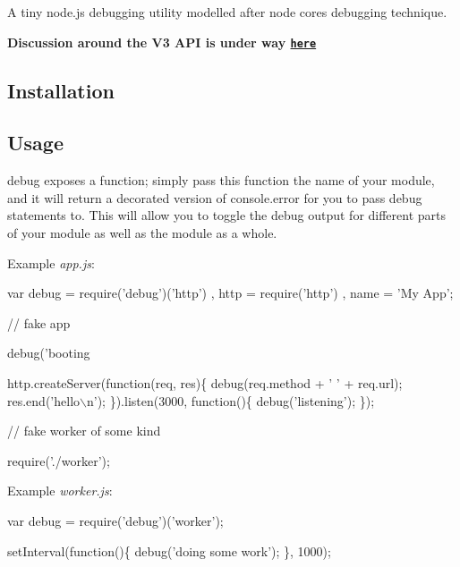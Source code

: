 \href{https://travis-ci.org/visionmedia/debug}{\tt } \href{https://coveralls.io/github/visionmedia/debug?branch=master}{\tt } \href{https://visionmedia-community-slackin.now.sh/}{\tt } \href{#backers}{\tt } \href{#sponsors}{\tt }

A tiny node.\+js debugging utility modelled after node core\textquotesingle{}s debugging technique.

{\bfseries Discussion around the V3 A\+PI is under way \href{https://github.com/visionmedia/debug/issues/370}{\tt here}}

\subsection*{Installation}




\subsection*{Usage}

{\ttfamily debug} exposes a function; simply pass this function the name of your module, and it will return a decorated version of {\ttfamily console.\+error} for you to pass debug statements to. This will allow you to toggle the debug output for different parts of your module as well as the module as a whole.

Example {\itshape app.\+js}\+:


\begin{DoxyCode}
var debug = require('debug')('http')
  , http = require('http')
  , name = 'My App';

// fake app

debug('booting %

http.createServer(function(req, res)\{
  debug(req.method + ' ' + req.url);
  res.end('hello\(\backslash\)n');
\}).listen(3000, function()\{
  debug('listening');
\});

// fake worker of some kind

require('./worker');
\end{DoxyCode}


Example {\itshape worker.\+js}\+:


\begin{DoxyCode}
var debug = require('debug')('worker');

setInterval(function()\{
  debug('doing some work');
\}, 1000);
\end{DoxyCode}


